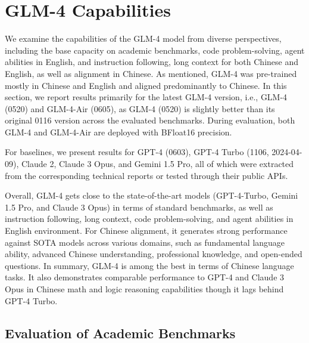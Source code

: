 \section{GLM-4 Capabilities}



We examine the capabilities of the GLM-4 model from diverse perspectives, including the base capacity on academic benchmarks, code problem-solving, agent abilities in English, and instruction following, long context for both Chinese and English, as well as alignment in Chinese. 
As mentioned, GLM-4 was pre-trained mostly  in Chinese and English and aligned predominantly to Chinese. 
In this section, we report results primarily for the latest GLM-4 version, i.e., GLM-4 (0520) and GLM-4-Air (0605), as GLM-4 (0520) is slightly better than its original 0116 version across the evaluated benchmarks. 
During evaluation, both GLM-4 and GLM-4-Air are deployed with BFloat16 precision.

For baselines, we present results for GPT-4 (0603), GPT-4 Turbo (1106, 2024-04-09), Claude 2, Claude 3 Opus, and Gemini 1.5 Pro, all of which were extracted from the corresponding technical reports or tested through  their public APIs. 

Overall, GLM-4 gets close to the state-of-the-art models (GPT-4-Turbo, Gemini 1.5 Pro, and Claude 3 Opus) in terms of standard benchmarks, as well as instruction following, long context, code problem-solving, and agent abilities in English environment. 
For Chinese alignment, it generates strong performance against SOTA models across various domains, such as fundamental language ability, advanced Chinese understanding, professional knowledge, and open-ended questions.  
In summary, GLM-4 is among the best in terms of Chinese language tasks. 
It also demonstrates comparable performance to GPT-4 and Claude 3 Opus in Chinese math and logic reasoning capabilities though it lags behind GPT-4 Turbo. 








\subsection{Evaluation of Academic Benchmarks}

